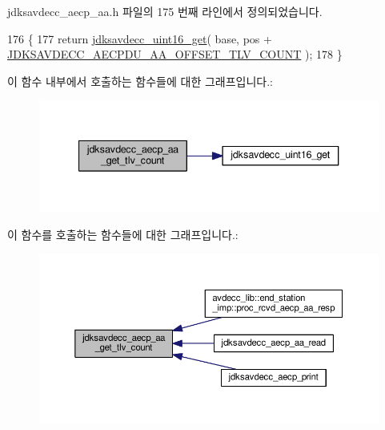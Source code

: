 jdksavdecc\+\_\+aecp\+\_\+aa.\+h 파일의 175 번째 라인에서 정의되었습니다.


\begin{DoxyCode}
176 \{
177     \textcolor{keywordflow}{return} \hyperlink{group__endian_ga3fbbbc20be954aa61e039872965b0dc9}{jdksavdecc\_uint16\_get}( base, pos + 
      \hyperlink{group___a_e_c_p___a_a__offsets_ga3365cbf982525053196ab7f3351abad1}{JDKSAVDECC\_AECPDU\_AA\_OFFSET\_TLV\_COUNT} );
178 \}
\end{DoxyCode}


이 함수 내부에서 호출하는 함수들에 대한 그래프입니다.\+:
\nopagebreak
\begin{figure}[H]
\begin{center}
\leavevmode
\includegraphics[width=340pt]{group___a_e_c_p___a_a_ga9bbfb30ebe22ee886ac1b783d64bd1aa_cgraph}
\end{center}
\end{figure}




이 함수를 호출하는 함수들에 대한 그래프입니다.\+:
\nopagebreak
\begin{figure}[H]
\begin{center}
\leavevmode
\includegraphics[width=350pt]{group___a_e_c_p___a_a_ga9bbfb30ebe22ee886ac1b783d64bd1aa_icgraph}
\end{center}
\end{figure}



